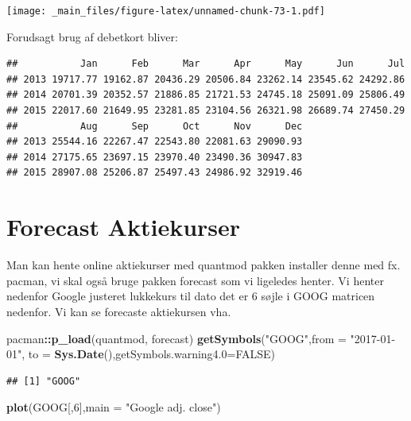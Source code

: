 \documentclass[]{book}
\newenvironment{Shaded}{\begin{snugshade}}{\end{snugshade}}
\newcommand{\DataTypeTok}[1]{\textcolor[rgb]{0.13,0.29,0.53}{#1}}
\newcommand{\DecValTok}[1]{\textcolor[rgb]{0.00,0.00,0.81}{#1}}
\newcommand{\KeywordTok}[1]{\textcolor[rgb]{0.13,0.29,0.53}{\textbf{#1}}}
\newcommand{\NormalTok}[1]{#1}
\newcommand{\OperatorTok}[1]{\textcolor[rgb]{0.81,0.36,0.00}{\textbf{#1}}}
\newcommand{\OtherTok}[1]{\textcolor[rgb]{0.56,0.35,0.01}{#1}}
\newcommand{\StringTok}[1]{\textcolor[rgb]{0.31,0.60,0.02}{#1}}
\begin{document}
\texttt{[image: \_main\_files/figure-latex/unnamed-chunk-73-1.pdf]}

Forudsagt brug af debetkort bliver:

\begin{Shaded}
\end{Shaded}

\begin{verbatim}
##           Jan      Feb      Mar      Apr      May      Jun      Jul
## 2013 19717.77 19162.87 20436.29 20506.84 23262.14 23545.62 24292.86
## 2014 20701.39 20352.57 21886.85 21721.53 24745.18 25091.09 25806.49
## 2015 22017.60 21649.95 23281.85 23104.56 26321.98 26689.74 27450.29
##           Aug      Sep      Oct      Nov      Dec
## 2013 25544.16 22267.47 22543.80 22081.63 29090.93
## 2014 27175.65 23697.15 23970.40 23490.36 30947.83
## 2015 28907.08 25206.87 25497.43 24986.92 32919.46
\end{verbatim}

\hypertarget{forecast-aktiekurser}{%
\section{Forecast Aktiekurser}\label{forecast-aktiekurser}}

Man kan hente online aktiekurser med quantmod pakken installer denne med fx. pacman, vi skal også bruge pakken forecast som vi ligeledes henter. Vi henter nedenfor Google justeret lukkekurs til dato det er 6 søjle i GOOG matricen nedenfor. Vi kan se forecaste aktiekursen vha.

\begin{Shaded}
\begin{Highlighting}[]
\NormalTok{pacman}\OperatorTok{::}\KeywordTok{p_load}\NormalTok{(quantmod, forecast)}
\KeywordTok{getSymbols}\NormalTok{(}\StringTok{"GOOG"}\NormalTok{,}\DataTypeTok{from =} \StringTok{"2017-01-01"}\NormalTok{, }\DataTypeTok{to =} \KeywordTok{Sys.Date}\NormalTok{(),}\DataTypeTok{getSymbols.warning4.0=}\OtherTok{FALSE}\NormalTok{)}
\end{Highlighting}
\end{Shaded}

\begin{verbatim}
## [1] "GOOG"
\end{verbatim}

\begin{Shaded}
\begin{Highlighting}[]
\KeywordTok{plot}\NormalTok{(GOOG[,}\DecValTok{6}\NormalTok{],}\DataTypeTok{main =} \StringTok{"Google adj. close"}\NormalTok{)}
\end{Highlighting}
\end{Shaded}
\end{document}
